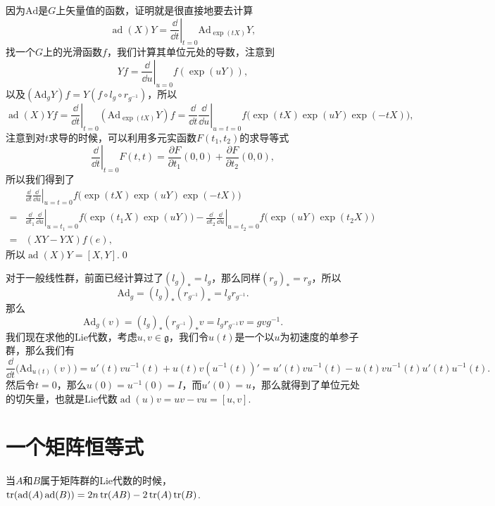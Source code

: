\documentclass[9pt]{extarticle}
\newcommand{\lag}{{\mathfrak{g}}}
\DeclareMathOperator{\ad}{ad}
\begin{document}
\proof 因为$\mathrm{Ad}$是$G$上矢量值的函数，证明就是很直接地要去计算
\[
	\ad(X)Y=\left.\frac{\dd}{\dd t}\right|_{t=0}\mathrm{Ad}_{\exp(tX)}Y,
\]
找一个$G$上的光滑函数$f$，我们计算其单位元处的导数，注意到
\[
	Yf=\left.\frac{\dd}{\dd u}\right|_{u=0}f(\exp(uY)),
\]
以及$(\mathrm{Ad}_{g}Y)f=Y(f\circ l_g\circ r_{g^{-1}})$，所以
\[
	\ad(X)Yf=\left.\frac{\dd}{\dd t}\right|_{t=0}(\mathrm{Ad}_{\exp(tX)}Y)f=\left.\frac{\dd}{\dd t}\frac{\dd}{\dd u}\right|_{u=t=0}f\bigl(\exp(tX)\exp(uY)\exp(-tX)\bigr),
\]
注意到对$t$求导的时候，可以利用多元实函数$F(t_1,t_2)$的求导等式
\[
	\left.\frac{\dd}{\dd t}\right|_{t=0}F(t,t)=\frac{\partial F}{\partial t_1}(0,0)+\frac{\partial F}{\partial t_2}(0,0),
\]
所以我们得到了
\[
\begin{split}
	&\left.\frac{\dd}{\dd t}\frac{\dd}{\dd u}\right|_{u=t=0}f\bigl(\exp(tX)\exp(uY)\exp(-tX)\bigr)\\
	=&\left.\frac{\dd}{\dd t_1}\frac{\dd}{\dd u}\right|_{u=t_1=0}f\bigl(\exp(t_1X)\exp(uY)\bigr)-\left.\frac{\dd}{\dd t_2}\frac{\dd}{\dd u}\right|_{u=t_2=0}f\bigl(\exp(uY)\exp(t_2X)\bigr)\\
	=&(XY-YX)f(e),
\end{split}
\]
所以$\ad(X)Y=[X,Y]$.\qed

\para 对于一般线性群，前面已经计算过了$(l_g)_*=l_g$，那么同样$(r_g)_*=r_g$，所以
\[
	\mathrm{Ad}_g=(l_g)_*(r_{g^{-1}})_*=l_gr_{g^{-1}}.
\]
那么
\[
	\mathrm{Ad}_g(v)=(l_g)_*(r_{g^{-1}})_*v=l_gr_{g^{-1}}v=gvg^{-1}.
\]
我们现在求他的Lie代数，考虑$u,v\in \lag$，我们令$u(t)$是一个以$u$为初速度的单参子群，那么我们有
\[
	\frac{\dd}{\dd t}\bigl(\mathrm{Ad}_{u(t)}(v)\bigr)=u'(t)vu^{-1}(t)+u(t)v(u^{-1}(t))'=u'(t)vu^{-1}(t)-u(t)vu^{-1}(t)u'(t)u^{-1}(t).
\]
然后令$t=0$，那么$u(0)=u^{-1}(0)=I$，而$u'(0)=u$，那么就得到了单位元处的切矢量，也就是Lie代数$\ad(u)v=uv-vu=[u,v]$.

\newpage

\section{一个矩阵恒等式}

\pro 当$A$和$B$属于矩阵群的Lie代数的时候，$\tr(\ad(A)\ad(B))=2n \tr(AB) -2\tr(A)\tr(B)$.
\end{document}
